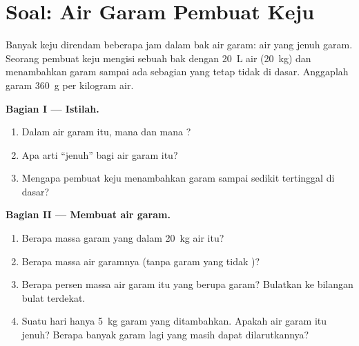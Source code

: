 \section{Soal: Air Garam Pembuat Keju}

\begin{problem}
\label{pb:g6:solutions-and-solubility:1}
Banyak keju direndam beberapa jam dalam bak air garam: air yang jenuh
garam. Seorang pembuat keju mengisi sebuah bak dengan \qty{20}{L} air
(\qty{20}{kg}) dan menambahkan garam sampai ada sebagian yang tetap tidak
 di dasar. Anggaplah  garam \qty{360}{g} per kilogram
air.

\medskip
\noindent\textbf{Bagian I --- Istilah.}
\begin{enumerate}
  \item Dalam air garam itu, mana  dan mana ?
  \item Apa arti ``jenuh'' bagi air garam itu?
  \item Mengapa pembuat keju menambahkan garam sampai sedikit tertinggal
        di dasar?
\end{enumerate}

\medskip
\noindent\textbf{Bagian II --- Membuat air garam.}
\begin{enumerate}[resume]
  \item Berapa massa garam yang  dalam \qty{20}{kg} air itu?
  \item Berapa massa air garamnya (tanpa garam yang tidak )?
  \item Berapa persen massa air garam itu yang berupa garam? Bulatkan ke
        bilangan bulat terdekat.
  \item Suatu hari hanya \qty{5}{kg} garam yang ditambahkan. Apakah air
        garam itu jenuh? Berapa banyak garam lagi yang masih dapat
        dilarutkannya?
\end{enumerate}


\end{problem}

